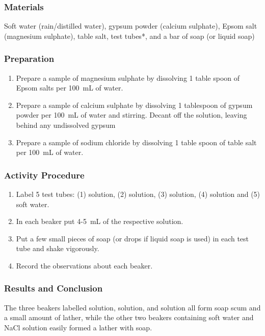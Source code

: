 \subsubsection*{Materials}
Soft water (rain/distilled water), gypsum powder (calcium sulphate), Epsom salt (magnesium sulphate), table salt, test tubes*, and a bar of soap (or liquid soap)

\subsubsection*{Preparation}
\begin{enumerate}
\item {Prepare a sample of magnesium sulphate by dissolving 1 table spoon of Epsom salts per 100~mL of water.}
\item {Prepare a sample of calcium sulphate by dissolving 1 tablespoon of gypsum powder per 100~mL of water and stirring. Decant off the solution, leaving behind any undissolved gypsum}
\item {Prepare a sample of sodium chloride by dissolving 1 table spoon of table salt per 100~mL of water.}

\end{enumerate}

\subsubsection*{Activity Procedure}
\begin{enumerate}
\item{Label 5 test tubes: (1)  solution, (2)  solution, (3)  solution, (4)  solution and (5) soft water.}
\item{In each beaker put 4-5~mL of the respective solution.}
\item{Put a few small pieces of soap (or drops if liquid soap is used) in each test tube and shake vigorously.}
\item{Record the observations about each beaker.}
\end{enumerate}

\subsubsection*{Results and Conclusion}
The three beakers labelled  solution,  solution, and  solution all form soap scum and a small amount of lather, while the other two beakers containing soft water and NaCl solution easily formed a lather with soap.

